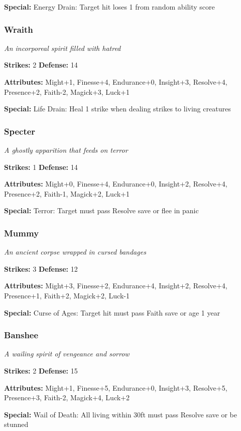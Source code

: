 \documentclass[10pt,twoside]{article}
\begin{document}
\textbf{Special:} Energy Drain: Target hit loses 1 from random ability score

\subsubsection{Wraith}
\textit{An incorporeal spirit filled with hatred}

\textbf{Strikes:} 2 \quad \textbf{Defense:} 14

\textbf{Attributes:} Might+1, Finesse+4, Endurance+0, Insight+3, Resolve+4, Presence+2, Faith-2, Magick+3, Luck+1

\textbf{Special:} Life Drain: Heal 1 strike when dealing strikes to living creatures

\subsubsection{Specter}
\textit{A ghostly apparition that feeds on terror}

\textbf{Strikes:} 1 \quad \textbf{Defense:} 14

\textbf{Attributes:} Might+0, Finesse+4, Endurance+0, Insight+2, Resolve+4, Presence+2, Faith-1, Magick+2, Luck+1

\textbf{Special:} Terror: Target must pass Resolve save or flee in panic

\subsubsection{Mummy}
\textit{An ancient corpse wrapped in cursed bandages}

\textbf{Strikes:} 3 \quad \textbf{Defense:} 12

\textbf{Attributes:} Might+3, Finesse+2, Endurance+4, Insight+2, Resolve+4, Presence+1, Faith+2, Magick+2, Luck-1

\textbf{Special:} Curse of Ages: Target hit must pass Faith save or age 1 year

\subsubsection{Banshee}
\textit{A wailing spirit of vengeance and sorrow}

\textbf{Strikes:} 2 \quad \textbf{Defense:} 15

\textbf{Attributes:} Might+1, Finesse+5, Endurance+0, Insight+3, Resolve+5, Presence+3, Faith-2, Magick+4, Luck+2

\textbf{Special:} Wail of Death: All living within 30ft must pass Resolve save or be stunned
\end{document}
